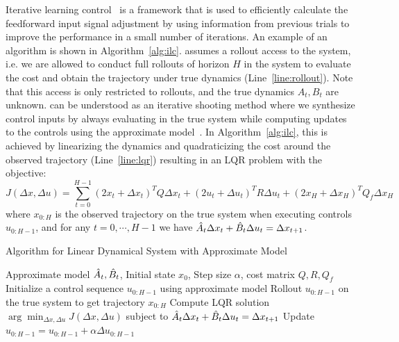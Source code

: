 Iterative learning control~\cite{arimoto84, DBLP:journals/jfr/MooreDB92} is a framework
that is used to efficiently calculate the feedforward input signal
adjustment by using information from previous trials to improve the
performance in a small number of iterations. An example of an \ILC{}
algorithm is shown in Algorithm~\ref{alg:ilc}.
\ILC{} assumes a rollout access to
the system, i.e. we are
allowed to conduct full rollouts of horizon $H$ in the system to evaluate the
cost and obtain the trajectory under true dynamics
(Line~\ref{line:rollout}). Note that this access is
only restricted to rollouts, and the true dynamics $A_{t}, B_{t}$ are unknown.
\ILC{} can be understood as an iterative shooting method where we
synthesize control inputs by 
always evaluating in the true system while computing updates to the controls
using the approximate model~\cite{abbeel2006using, DBLP:conf/icml/AgarwalHMS21}. In
Algorithm~\ref{alg:ilc}, this is achieved by linearizing the
dynamics and quadraticizing the cost around the observed
trajectory (Line~\ref{line:lqr}) resulting in an LQR problem with the objective:
\begin{equation}
  \label{eq:5}
  J(\Delta x, \Delta u) = \sum_{t=0}^{H-1} (2x_t + \Delta x_t)^TQ\Delta x_t +
    (2u_t + \Delta u_t)^TR\Delta u_t + (2x_H + \Delta x_H)^TQ_f\Delta x_H 
  \end{equation}
  where $x_{0:H}$ is the observed trajectory on the true system when
  executing controls $u_{0:H-1}$, and for any $t=0, \cdots, H-1$ we
  have $\hat{A}_t\Delta x_t + \hat{B}_t\Delta u_t = \Delta x_{t+1}$.
  \begin{algorithm}[t]
    \small
  \caption{\ILC{} Algorithm for Linear Dynamical System with
    Approximate Model}
  \label{alg:ilc}
  \begin{algorithmic}[1]
     Approximate model $\hat{A}_t,
    \hat{B}_t$, Initial state $x_0$, Step size $\alpha$, cost matrix
    $Q, R, Q_f$
    \State Initialize a control sequence $u_{0:H-1}$ using approximate
    model
    \State Rollout $u_{0:H-1}$ on the true system to get trajectory
    $x_{0:H}$\label{line:rollout}
    \State Compute LQR solution $\arg\min_{\Delta x, \Delta u} J(\Delta x, \Delta u)$ subject to $\hat{A}_t\Delta x_t + \hat{B}_t\Delta u_t = \Delta x_{t+1}$ \label{line:lqr}
    \State Update $u_{0:H-1} = u_{0:H-1} + \alpha \Delta u_{0:H-1}$
    \EndWhile
  \end{algorithmic}
\end{algorithm}

